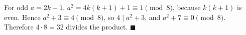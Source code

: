 For odd $a=2k+1$, $a^2=4k(k+1)+1\equiv1\pmod8$, because $k(k+1)$ is even. Hence $a^2+3\equiv4\pmod8$, so $4\mid a^2+3$, and $a^2+7\equiv0\pmod8$. Therefore $4\cdot8=32$ divides the product. $\blacksquare$
